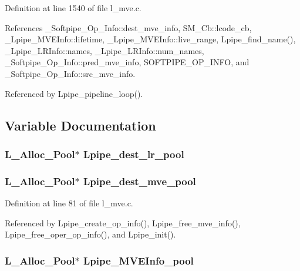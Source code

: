 Definition at line 1540 of file l\_\-mve.c.

References \_\-Softpipe\_\-Op\_\-Info::dest\_\-mve\_\-info, SM\_\-Cb::lcode\_\-cb, \_\-Lpipe\_\-MVEInfo::lifetime, \_\-Lpipe\_\-MVEInfo::live\_\-range, Lpipe\_\-find\_\-name(), \_\-Lpipe\_\-LRInfo::names, \_\-Lpipe\_\-LRInfo::num\_\-names, \_\-Softpipe\_\-Op\_\-Info::pred\_\-mve\_\-info, SOFTPIPE\_\-OP\_\-INFO, and \_\-Softpipe\_\-Op\_\-Info::src\_\-mve\_\-info.

Referenced by Lpipe\_\-pipeline\_\-loop().

\subsection{Variable Documentation}
\subsubsection{\setlength{\rightskip}{0pt plus 5cm}L\_\-Alloc\_\-Pool$\ast$ \bf{Lpipe\_\-dest\_\-lr\_\-pool}}\label{l__mve_8h_d85d3aeb137a2d43ed21f163dc4a88c8}


\subsubsection{\setlength{\rightskip}{0pt plus 5cm}L\_\-Alloc\_\-Pool$\ast$ \bf{Lpipe\_\-dest\_\-mve\_\-pool}}\label{l__mve_8h_4fd7a438ad2a7b1efa5d57d7aa1933b2}




Definition at line 81 of file l\_\-mve.c.

Referenced by Lpipe\_\-create\_\-op\_\-info(), Lpipe\_\-free\_\-mve\_\-info(), Lpipe\_\-free\_\-oper\_\-op\_\-info(), and Lpipe\_\-init().
\subsubsection{\setlength{\rightskip}{0pt plus 5cm}L\_\-Alloc\_\-Pool$\ast$ \bf{Lpipe\_\-MVEInfo\_\-pool}}\label{l__mve_8h_47ef06dbc5fdfb506db61338bd91c45d}




